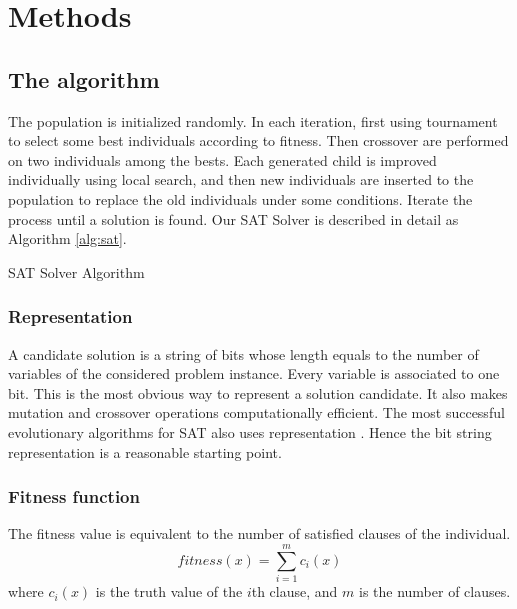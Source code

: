	\section{Methods}
	\subsection{The algorithm}
	The population is initialized randomly.  In each iteration, first using tournament to select some best individuals according to fitness.
	Then crossover are performed on two individuals among the bests. Each
	generated child is improved individually using local search, and then new individuals are inserted to the population to replace the old
	individuals under some conditions. Iterate the process until a solution is found.
	Our SAT Solver is described in detail as Algorithm \ref{alg:sat}.
	\begin{algorithm}
	    \SetAlgoLined
	    \caption{SAT Solver Algorithm}
	    \label{alg:sat} 
	    \BlankLine
	  \end{algorithm}
	
	\subsubsection{Representation}
	A candidate solution is a string of bits whose length equals to the number of
	variables of the considered problem instance. Every variable is associated to
	one bit. This is the most obvious way to represent a solution candidate. It
	also makes mutation and crossover operations computationally efficient. The
	most successful evolutionary algorithms for SAT also uses representation
	\parencite{gottlieb_marchiori_rossi_2002}. Hence the bit string representation is a reasonable
	starting point.
	
	\subsubsection{Fitness function}
	The fitness value is equivalent to the number of satisfied clauses of the
	individual.
	\begin{equation*}
		\mathit{fitness}(x) = \sum_{i=1}^m c_i(x)
	\end{equation*}
	where $c_i(x)$ is the truth value of the $i$th
	clause, and $m$ is the number of clauses.
	

